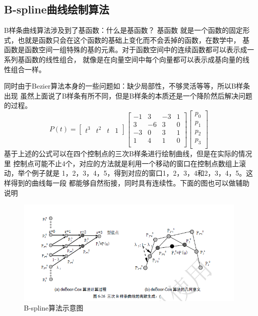 \documentclass[a4paper,UTF8]{article}
\theoremstyle{definition}
\begin{document}
\subsection{B-spline曲线绘制算法}
\par B样条曲线算法涉及到了基函数：什么是基函数？
基函数 就是一个函数的固定形式，也就是函数只会在这个函数的基础上变化而不会丢掉的函数，在数学中，
基函数是函数空间一组特殊的基的元素。对于函数空间中的连续函数都可以表示成一系列基函数的线性组合，
就像是在向量空间中每个向量都可以表示成基向量的线性组合一样。
\par 同时由于Bezier算法本身的一些问题如：缺少局部性，不够灵活等等，所以B样条出现
虽然上面说了B样条有所不同，但是B样条的本质还是一个降阶然后解决问题的过程。
$$
P(t)=
\begin{bmatrix} 
    t^3 & t^2 & t & 1 
\end{bmatrix}
\begin{bmatrix} 
    -1 & 3 & -3 & 1 \\ 
    3 & -6 & 3 & 0 \\ 
    -3 & 0 & 3 & 1 \\ 
    1 & 4 & 1 & 0 \\ 
\end{bmatrix}
\begin{bmatrix} 
    p_0 \\ 
    p_1 \\ 
    p_2 \\ 
    p_3 \\ 
\end{bmatrix}
$$
基于上述的公式可以在四个控制点的三次B样条进行绘制曲线，但是在实际的情况里
控制点可能不止4个，对应的方法就是利用一个移动的窗口在控制点数组上滚动，举个例子就是
1，2，3，4，5，得到对应的窗口1，2，3，4和2，3，4，5。这样得到的曲线每一段
都能够自然衔接，同时具有连续性。下面的图也可以做辅助说明
\begin{figure}[h]
	\centering
	\includegraphics[scale=0.6]{figure/b-spline.png}
	\caption{B-spline算法示意图}
	\label{fig:b-spline-alg}
\end{figure}
\end{document}

